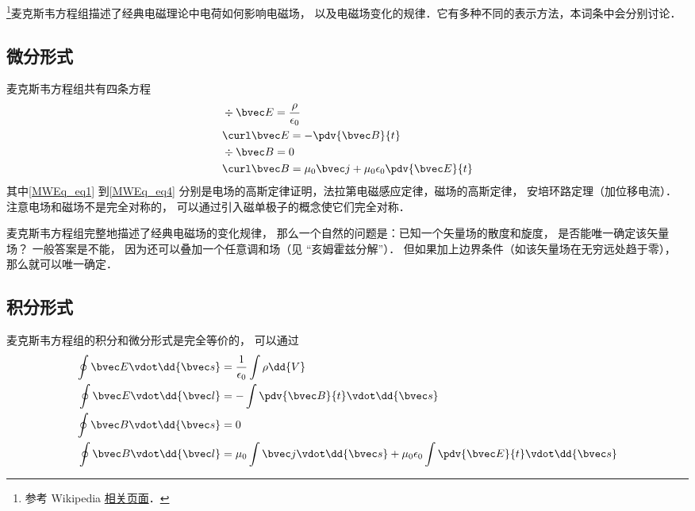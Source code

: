 
\begin{issues}
\issueDraft
\end{issues}

\footnote{参考 Wikipedia \href{https://en.wikipedia.org/wiki/Maxwell's_equations}{相关页面}．}麦克斯韦方程组描述了经典电磁理论中电荷如何影响电磁场， 以及电磁场变化的规律．它有多种不同的表示方法，本词条中会分别讨论．

\subsection{微分形式}
麦克斯韦方程组共有四条方程
\begin{align}
\label{MWEq_eq1}
&\div \bvec E = \frac{\rho}{\epsilon_0}\\
\label{MWEq_eq2}
&\curl \bvec E = -\pdv{\bvec B}{t}\\
\label{MWEq_eq3}
&\div \bvec B = 0 \\
\label{MWEq_eq4}
&\curl \bvec B = \mu_0 \bvec j + \mu_0\epsilon_0 \pdv{\bvec E}{t}
\end{align}
其中\autoref{MWEq_eq1} 到\autoref{MWEq_eq4} 分别是电场的高斯定律证明，法拉第电磁感应定律，磁场的高斯定律， 安培环路定理（加位移电流）．%
注意电场和磁场不是完全对称的， 可以通过引入磁单极子的概念使它们完全对称．

麦克斯韦方程组完整地描述了经典电磁场的变化规律， 那么一个自然的问题是：已知一个矢量场的散度和旋度， 是否能唯一确定该矢量场？ 一般答案是不能， 因为还可以叠加一个任意调和场（见 “亥姆霍兹分解”）． 但如果加上边界条件（如该矢量场在无穷远处趋于零）， 那么就可以唯一确定．

\subsection{积分形式}
麦克斯韦方程组的积分和微分形式是完全等价的， 可以通过
\begin{align}
\oint \bvec E \vdot \dd{\bvec s} &= \frac{1}{\epsilon_0}\int \rho \dd{V}\\
\oint \bvec E \vdot \dd{\bvec l} &= -\int \pdv{\bvec B}{t} \vdot \dd{\bvec s}\\
\oint \bvec B \vdot \dd{\bvec s} &= 0\\
\oint \bvec B \vdot \dd{\bvec l} &= \mu_0 \int \bvec j \vdot \dd{\bvec s} + \mu_0 \epsilon_0 \int \pdv{\bvec E}{t} \vdot \dd{\bvec s}
\end{align}

